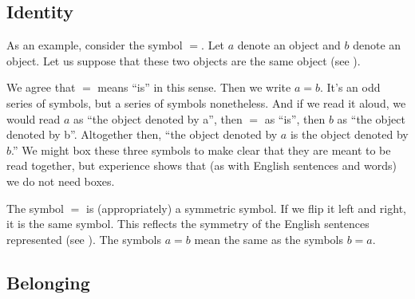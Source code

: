 \subsection*{Identity}

As an example, consider the symbol $=$.
Let $a$ denote an object and $b$ denote an object.
Let us suppose that these two objects are the same object (see ).
%  

We agree that $=$ means ``is'' in this sense.
Then we write $a = b$.
It's an odd series of symbols, but a series of symbols nonetheless.
And if we read it aloud, we would read $a$ as ``the object denoted by a'', then $=$ as ``is'', then $b$ as ``the object denoted by b''.
Altogether then, ``the object denoted by $a$ is the object denoted by $b$.''
We might box these three symbols  to make clear that they are meant to be read together, but experience shows that (as with English sentences and words) we do not need boxes.


%  

The symbol $=$ is (appropriately) a symmetric symbol.
If we flip it left and right, it is the same symbol.
This reflects the symmetry of the English sentences represented (see ).
The symbols $a = b$ mean the same as the symbols $b = a$.


\subsection*{Belonging}

